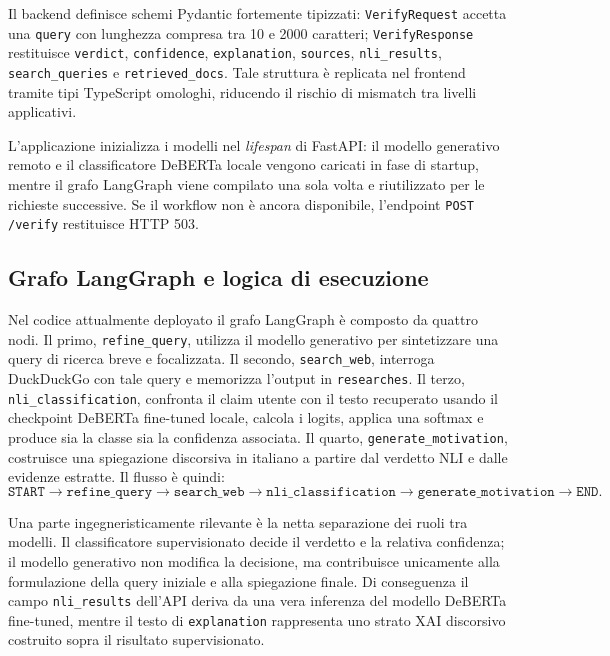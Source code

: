 \documentclass[10pt,a4paper]{article}
\begin{document}
Il backend definisce schemi Pydantic fortemente tipizzati: \texttt{VerifyRequest} accetta una \texttt{query} con lunghezza compresa tra 10 e 2000 caratteri; \texttt{VerifyResponse} restituisce \texttt{verdict}, \texttt{confidence}, \texttt{explanation}, \texttt{sources}, \texttt{nli\_results}, \texttt{search\_queries} e \texttt{retrieved\_docs}. Tale struttura è replicata nel frontend tramite tipi TypeScript omologhi, riducendo il rischio di mismatch tra livelli applicativi.

L'applicazione inizializza i modelli nel \textit{lifespan} di FastAPI: il modello generativo remoto e il classificatore DeBERTa locale vengono caricati in fase di startup, mentre il grafo LangGraph viene compilato una sola volta e riutilizzato per le richieste successive. Se il workflow non è ancora disponibile, l'endpoint \texttt{POST /verify} restituisce HTTP 503.

\subsection{Grafo LangGraph e logica di esecuzione}

Nel codice attualmente deployato il grafo LangGraph è composto da quattro nodi. Il primo, \texttt{refine\_query}, utilizza il modello generativo per sintetizzare una query di ricerca breve e focalizzata. Il secondo, \texttt{search\_web}, interroga DuckDuckGo con tale query e memorizza l'output in \texttt{researches}. Il terzo, \texttt{nli\_classification}, confronta il claim utente con il testo recuperato usando il checkpoint DeBERTa fine-tuned locale, calcola i logits, applica una softmax e produce sia la classe sia la confidenza associata. Il quarto, \texttt{generate\_motivation}, costruisce una spiegazione discorsiva in italiano a partire dal verdetto NLI e dalle evidenze estratte. Il flusso è quindi:
\[
\texttt{START} \rightarrow \texttt{refine\_query} \rightarrow \texttt{search\_web} \rightarrow \texttt{nli\_classification} \rightarrow \texttt{generate\_motivation} \rightarrow \texttt{END}.
\]

Una parte ingegneristicamente rilevante è la netta separazione dei ruoli tra modelli. Il classificatore supervisionato decide il verdetto e la relativa confidenza; il modello generativo non modifica la decisione, ma contribuisce unicamente alla formulazione della query iniziale e alla spiegazione finale. Di conseguenza il campo \texttt{nli\_results} dell'API deriva da una vera inferenza del modello DeBERTa fine-tuned, mentre il testo di \texttt{explanation} rappresenta uno strato XAI discorsivo costruito sopra il risultato supervisionato.
\end{document}
